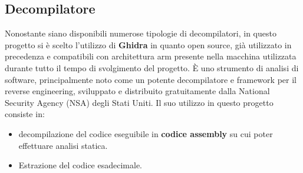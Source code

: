     
        
            
                


\subsection{Decompilatore}
Nonostante siano disponibili numerose tipologie di decompilatori, in questo progetto si è scelto l'utilizzo di \textbf{Ghidra} in quanto open source, già utilizzato in precedenza e compatibili con architettura arm presente nella macchina utilizzata durante tutto il tempo di svolgimento del progetto. È uno strumento di analisi di software, principalmente noto come un potente decompilatore e framework per il reverse engineering, sviluppato e distribuito gratuitamente dalla National Security Agency (NSA) degli Stati Uniti. Il suo utilizzo in questo progetto consiste in:
\begin{itemize}
    \item decompilazione del codice eseguibile in \textbf{codice assembly} su cui poter effettuare analisi statica. 
    \item Estrazione del codice esadecimale.
\end{itemize}

